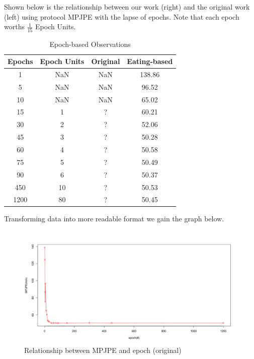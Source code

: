 \documentclass[10pt,twocolumn,letterpaper]{article}
\begin{document}
Shown below is the relationship between our work (right) and the original work (left) using protocol MPJPE with the
lapse of epochs.
Note that each epoch worths $\frac{1}{15}$ Epoch Units.

\begin{table}[H]
\caption{Epoch-based Observations}
\centering
\begin{tabular}{cccc}
\hline
Epochs & Epoch Units & Original & Eating-based\\
\hline

1& NaN & NaN & 138.86 \\
5& NaN & NaN & 96.52  \\
10& NaN & NaN & 65.02  \\
15& 1 & ? & 60.21 \\
30& 2 & ? & 52.06 \\
45& 3 & ? & 50.28  \\
60& 4 & ? & 50.58  \\
75& 5 & ? & 50.49  \\
90& 6 & ? & 50.37 \\
450& 10 & ? & 50.53 \\
1200& 80 & ? & 50.45 \\


\hline
\end{tabular}
\end{table}

Transforming data into more readable format we gain the graph below.

\begin{figure}[H]
	\begin{center}
  		\includegraphics[width=0.9\linewidth]{MPJPE_epoch_overall.png}
	\end{center}
   	\caption{Relationship between MPJPE and epoch (original)}
	\label{fig:long}
	\label{fig:onecol}
\end{figure}
\end{document}
